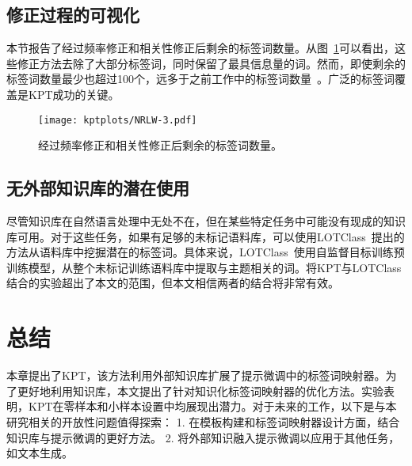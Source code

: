\subsection{修正过程的可视化}
\label{app:remainwords}
本节报告了经过频率修正和相关性修正后剩余的标签词数量。从图~\ref{fig:remainwords}可以看出，这些修正方法去除了大部分标签词，同时保留了最具信息量的词。然而，即使剩余的标签词数量最少也超过100个，远多于之前工作中的标签词数量~\cite{schick2020automatically}。广泛的标签词覆盖是KPT成功的关键。

\begin{figure}[!htbp]
    \centering
    \texttt{[image: kptplots/NRLW-3.pdf]}
    \caption{经过频率修正和相关性修正后剩余的标签词数量。}
    \label{fig:remainwords}
\end{figure}

\subsection{无外部知识库的潜在使用}
\label{withoutkb}
尽管知识库在自然语言处理中无处不在，但在某些特定任务中可能没有现成的知识库可用。对于这些任务，如果有足够的未标记语料库，可以使用LOTClass~\cite{meng2020text}提出的方法从语料库中挖掘潜在的标签词。具体来说，LOTClass~\cite{meng2020text}使用自监督目标训练预训练模型，从整个未标记训练语料库中提取与主题相关的词。将KPT与LOTClass结合的实验超出了本文的范围，但本文相信两者的结合将非常有效。

\section{总结}
本章提出了KPT，该方法利用外部知识库扩展了提示微调中的标签词映射器。为了更好地利用知识库，本文提出了针对知识化标签词映射器的优化方法。实验表明，KPT在零样本和小样本设置中均展现出潜力。对于未来的工作，以下是与本研究相关的开放性问题值得探索：
1. 在模板构建和标签词映射器设计方面，结合知识库与提示微调的更好方法。
2. 将外部知识融入提示微调以应用于其他任务，如文本生成。

